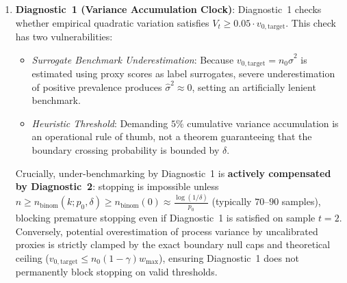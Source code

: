 \documentclass[11pt,a4paper]{article}
\begin{document}
\begin{enumerate}[leftmargin=*]
    \item \textbf{Diagnostic~1 (Variance Accumulation Clock)}:
    Diagnostic~1 checks whether empirical quadratic variation satisfies $V_t \ge 0.05 \cdot v_{0, \text{target}}$. This check has two vulnerabilities:
    \begin{itemize}
        \item \emph{Surrogate Benchmark Underestimation}: Because $v_{0, \text{target}} = n_0 \hat{\sigma}^2$ is estimated using proxy scores as label surrogates, severe underestimation of positive prevalence produces $\hat{\sigma}^2 \approx 0$, setting an artificially lenient benchmark.
        \item \emph{Heuristic Threshold}: Demanding $5\%$ cumulative variance accumulation is an operational rule of thumb, not a theorem guaranteeing that the boundary crossing probability is bounded by $\delta$.
    \end{itemize}
    Crucially, under-benchmarking by Diagnostic~1 is \textbf{actively compensated by Diagnostic~2}: stopping is impossible unless $n \ge n_{\text{binom}}(k; p_0, \delta) \ge n_{\text{binom}}(0) \approx \frac{\log(1/\delta)}{p_0}$ (typically $70\text{--}90$ samples), blocking premature stopping even if Diagnostic~1 is satisfied on sample $t=2$. Conversely, potential overestimation of process variance by uncalibrated proxies is strictly clamped by the exact boundary null caps and theoretical ceiling ($v_{0, \text{target}} \le n_0 (1 - \gamma) w_{\max}$), ensuring Diagnostic~1 does not permanently block stopping on valid thresholds.


\end{enumerate}
\end{document}
